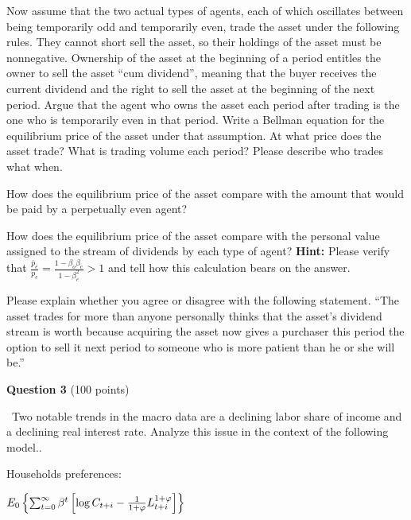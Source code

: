 \documentclass[11pt]{article}
\begin{document}
\medskip
{}  Now assume that the  two actual types of agents, each of which oscillates between being temporarily odd and temporarily even,  trade the asset
under the following rules. They cannot short sell the asset, so their holdings of the asset must be nonnegative.  Ownership of the asset at the beginning of a period entitles the owner to sell the asset ``cum dividend'', meaning that the buyer
receives the current dividend and the right to sell the asset at the beginning of the next period.
Argue  that the agent who owns  the asset each period after trading  is the one who is temporarily even in that period.  Write a Bellman equation for the equilibrium price
of the asset under that assumption.
At what price does the asset trade? What is trading volume each period?  Please describe who trades what when.

\medskip
{}  How does the equilibrium price of the asset compare with the amount that would be paid by a perpetually even agent?

\medskip
{} How does the equilibrium price of the asset compare with the personal value  assigned  to the stream of dividends  by each type of agent?
{\bf Hint:} Please verify  that ${\frac{\bar p_e}{p_e}} = {\frac{ 1- \beta_o \beta_e}{1 - \beta_e^2}} >1$ and tell how this calculation bears on the answer.

\medskip
{}  Please explain whether you agree or disagree with the following statement.  ``The asset trades for more than anyone personally thinks that the asset's dividend stream is worth because
acquiring the asset now gives a purchaser this period  the option to sell it next period to someone who is more patient than  he or she will be.''



\newpage


\noindent \textbf{Question 3} (100 points)\medskip

\noindent\ Two notable trends in the macro data are a declining labor share
of income and a declining real interest rate. Analyze this issue in the
context of the following model..

\qquad Households preferences:

\begin{center}
$E_{0}\left\{ \sum_{t=0}^{\infty }\beta ^{t}\left[ \log C_{t+i}-\frac{1}{%
1+\varphi }L_{t+i}^{1+\varphi }\right] \right\} $
\end{center}
\end{document}
